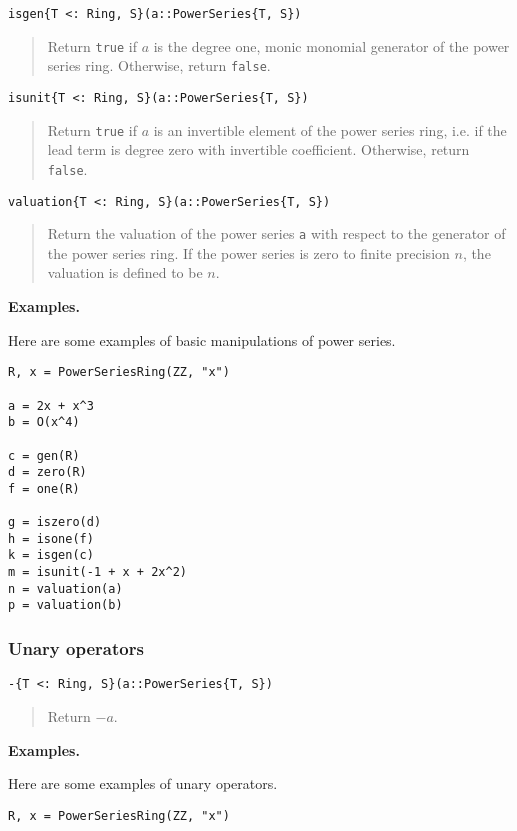 \documentclass[a4paper,10pt]{article}
\newcommand{\code}{\lstinline}
\newcommand{\desc}[1]{\vspace{-3mm}\begin{quote}#1\end{quote}}
\begin{document}
{{{\begin{lstlisting}
isgen{T <: Ring, S}(a::PowerSeries{T, S})
\end{lstlisting}

\desc{Return \code{true} if $a$ is the degree one, monic monomial generator of
the power series ring. Otherwise, return \code{false}.}

\begin{lstlisting}
isunit{T <: Ring, S}(a::PowerSeries{T, S})
\end{lstlisting}

\desc{Return \code{true} if $a$ is an invertible element of the power series
ring, i.e. if the lead term is degree zero with invertible coefficient.
Otherwise, return \code{false}.}

\begin{lstlisting}
valuation{T <: Ring, S}(a::PowerSeries{T, S})
\end{lstlisting}

\desc{Return the valuation of the power series \code{a} with respect to the
generator of the power series ring. If the power series is zero to finite
precision $n$, the valuation is defined to be $n$.}

\textbf{Examples.}

Here are some examples of basic manipulations of power series.

\begin{lstlisting}
R, x = PowerSeriesRing(ZZ, "x")

a = 2x + x^3
b = O(x^4)

c = gen(R)
d = zero(R)
f = one(R)

g = iszero(d)
h = isone(f)
k = isgen(c)
m = isunit(-1 + x + 2x^2)
n = valuation(a)
p = valuation(b)
\end{lstlisting}

\subsubsection{Unary operators}

\begin{lstlisting}
-{T <: Ring, S}(a::PowerSeries{T, S})
\end{lstlisting}

\desc{Return $-a$.}

\textbf{Examples.}

Here are some examples of unary operators.

\begin{lstlisting}
R, x = PowerSeriesRing(ZZ, "x")


\end{lstlisting}}}}
\end{document}
